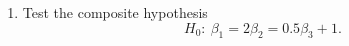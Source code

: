 \documentclass[12pt]{article}
\begin{document}
\begin{enumerate}
\begin{enumerate}
\item Test the composite hypothesis
\[
H_0:\ \beta_1 = 2\beta_2 = 0.5\beta_3 + 1.
\]
\end{enumerate}

\end{enumerate}
\end{document}
